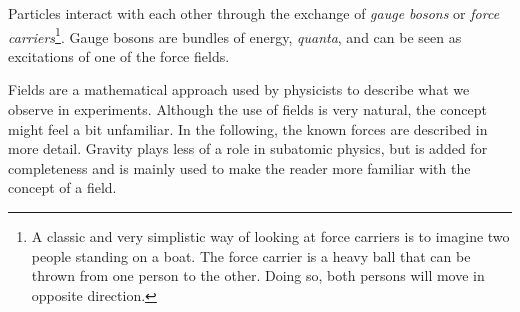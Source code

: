 Particles interact with each other through the exchange of \textit{gauge bosons} or \textit{force carriers}\footnote{A classic and very simplistic way of looking at force carriers is to imagine two people standing on a boat. The force carrier is a heavy ball that can be thrown from one person to the other. Doing so, both persons will move in opposite direction.}. Gauge bosons are bundles of energy, \textit{quanta}, and can be seen as excitations of one of the force fields.

Fields are a mathematical approach used by physicists to describe what we observe in experiments. Although the use of fields is very natural, the concept might feel a bit unfamiliar. In the following, the known forces are described in more detail. Gravity plays less of a role in subatomic physics, but is added for completeness and is mainly used to make the reader more familiar with the concept of a field.


